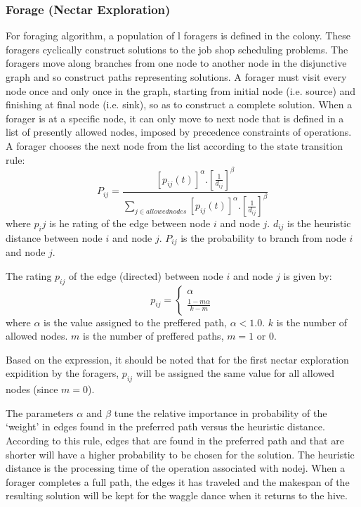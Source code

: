 \documentclass[pdftex,11pt]{article}
\begin{document}
\subsubsection{Forage (Nectar Exploration)}
For foraging algorithm, a population of l foragers is defined in the colony. These foragers cyclically construct solutions to the job shop scheduling problems. The foragers move along branches from one node to another node in the disjunctive graph and so construct paths representing solutions. A forager must visit every node once and only once in the graph, starting from initial node (i.e. source) and finishing at final node (i.e. sink), so as to construct a complete solution. When a forager is at a specific node, it can only move to next node that is defined in a list of presently allowed nodes, imposed by precedence constraints of operations. A forager chooses the next node from the list according to the state transition rule:
\begin{equation}
P_{ij} = \frac{[p_{ij}(t)]^\alpha . [\frac{1}{d_{ij}}]^\beta}{\sum_{j \in allowednodes}[p_{ij}(t)]^\alpha . [\frac{1}{d_{ij}}]^\beta}
\end{equation}
where $p_ij$ is he rating of the edge between node $i$ and node $j$. $d_{ij}$ is the heuristic distance between node $i$ and node $j$. $P_{ij}$ is the probability to branch from node $i$ and node $j$.

The rating $p_{ij}$ of the edge (directed) between node $i$ and node $j$ is given by:
\begin{equation}
p_{ij} =
\begin{cases}
	\alpha \\
	\frac{1 - m\alpha}{k-m}
\end{cases}
\end{equation}
where $\alpha$ is the value assigned to the preffered path, $\alpha < 1.0$. $k$ is the number of allowed nodes. $m$ is the number of preffered paths, $m = 1 \text{ or } 0$.

Based on the expression, it should be noted that for the first nectar exploration expidition by the foragers, $p_{ij}$ will be assigned the same value for all allowed nodes (since $m=0$).

The parameters $\alpha$ and $\beta$ tune the relative importance in probability of the ‘weight’ in edges found in the preferred path versus the heuristic distance. According to this rule, edges that are found in the preferred path and that are shorter will have a higher probability to be chosen for the solution. The heuristic distance is the processing time of the operation associated with nodej. When a forager completes a full path, the edges it has traveled and the makespan of the resulting solution will be kept for the waggle dance when it returns to the hive.
\end{document}
